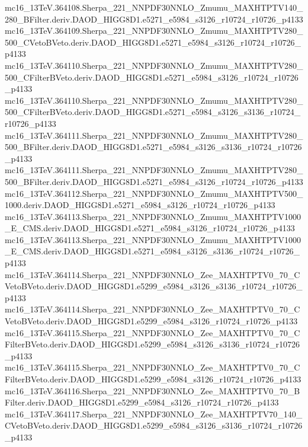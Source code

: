\begin{scriptsize}
mc16\_13TeV.364108.Sherpa\_221\_NNPDF30NNLO\_Zmumu\_MAXHTPTV140\_280\_BFilter.deriv.DAOD\_HIGG8D1.e5271\_e5984\_s3126\_r10724\_r10726\_p4133 \\
mc16\_13TeV.364109.Sherpa\_221\_NNPDF30NNLO\_Zmumu\_MAXHTPTV280\_500\_CVetoBVeto.deriv.DAOD\_HIGG8D1.e5271\_e5984\_s3126\_r10724\_r10726\_p4133 \\
mc16\_13TeV.364110.Sherpa\_221\_NNPDF30NNLO\_Zmumu\_MAXHTPTV280\_500\_CFilterBVeto.deriv.DAOD\_HIGG8D1.e5271\_e5984\_s3126\_r10724\_r10726\_p4133 \\
mc16\_13TeV.364110.Sherpa\_221\_NNPDF30NNLO\_Zmumu\_MAXHTPTV280\_500\_CFilterBVeto.deriv.DAOD\_HIGG8D1.e5271\_e5984\_s3126\_s3136\_r10724\_r10726\_p4133 \\
mc16\_13TeV.364111.Sherpa\_221\_NNPDF30NNLO\_Zmumu\_MAXHTPTV280\_500\_BFilter.deriv.DAOD\_HIGG8D1.e5271\_e5984\_s3126\_s3136\_r10724\_r10726\_p4133 \\
mc16\_13TeV.364111.Sherpa\_221\_NNPDF30NNLO\_Zmumu\_MAXHTPTV280\_500\_BFilter.deriv.DAOD\_HIGG8D1.e5271\_e5984\_s3126\_r10724\_r10726\_p4133 \\
mc16\_13TeV.364112.Sherpa\_221\_NNPDF30NNLO\_Zmumu\_MAXHTPTV500\_1000.deriv.DAOD\_HIGG8D1.e5271\_e5984\_s3126\_r10724\_r10726\_p4133 \\
mc16\_13TeV.364113.Sherpa\_221\_NNPDF30NNLO\_Zmumu\_MAXHTPTV1000\_E\_CMS.deriv.DAOD\_HIGG8D1.e5271\_e5984\_s3126\_r10724\_r10726\_p4133 \\
mc16\_13TeV.364113.Sherpa\_221\_NNPDF30NNLO\_Zmumu\_MAXHTPTV1000\_E\_CMS.deriv.DAOD\_HIGG8D1.e5271\_e5984\_s3126\_s3136\_r10724\_r10726\_p4133 \\
mc16\_13TeV.364114.Sherpa\_221\_NNPDF30NNLO\_Zee\_MAXHTPTV0\_70\_CVetoBVeto.deriv.DAOD\_HIGG8D1.e5299\_e5984\_s3126\_s3136\_r10724\_r10726\_p4133 \\
mc16\_13TeV.364114.Sherpa\_221\_NNPDF30NNLO\_Zee\_MAXHTPTV0\_70\_CVetoBVeto.deriv.DAOD\_HIGG8D1.e5299\_e5984\_s3126\_r10724\_r10726\_p4133 \\
mc16\_13TeV.364115.Sherpa\_221\_NNPDF30NNLO\_Zee\_MAXHTPTV0\_70\_CFilterBVeto.deriv.DAOD\_HIGG8D1.e5299\_e5984\_s3126\_s3136\_r10724\_r10726\_p4133 \\
mc16\_13TeV.364115.Sherpa\_221\_NNPDF30NNLO\_Zee\_MAXHTPTV0\_70\_CFilterBVeto.deriv.DAOD\_HIGG8D1.e5299\_e5984\_s3126\_r10724\_r10726\_p4133 \\
mc16\_13TeV.364116.Sherpa\_221\_NNPDF30NNLO\_Zee\_MAXHTPTV0\_70\_BFilter.deriv.DAOD\_HIGG8D1.e5299\_e5984\_s3126\_r10724\_r10726\_p4133 \\
mc16\_13TeV.364117.Sherpa\_221\_NNPDF30NNLO\_Zee\_MAXHTPTV70\_140\_CVetoBVeto.deriv.DAOD\_HIGG8D1.e5299\_e5984\_s3126\_s3136\_r10724\_r10726\_p4133 \\

\end{scriptsize}
